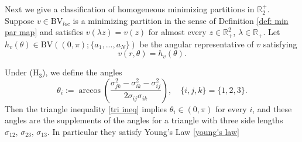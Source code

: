 \documentclass[leqno,11pt]{amsart}
\let\s=\sigma
\let\f=\frac
\theoremstyle{remark}
\newcommand{\BR}{\mathbb{R}}
\begin{document}
Next we give a classification of homogeneous minimizing partitions in $\BR_2^+$. Suppose $v\in \mathrm{BV}_{loc}$ is a minimizing partition in the sense of Definition \ref{def: min par map} and satisfies $v(\lambda z)=v(z)$ for almost every $z\in\BR_+^2$, $\lambda\in\BR_+$. Let $h_v(\theta)\in \mathrm{BV}((0,\pi);\{a_1,...,a_N\})$ be the angular representative of $v$ satisfying
\begin{equation*}
    v(r,\theta)=h_v(\theta). 
\end{equation*}

Under ($\mathrm{H}_3$), we define the angles 
\begin{equation*}
    \theta_i:= \arccos{(\f{\sigma_{jk}^2-\s_{ik}^2-\s_{ij}^2}{2\sigma_{ij}\s_{ik}})},\quad \{i,j,k\}=\{1,2,3\}.
\end{equation*}
Then the triangle inequality \eqref{tri ineq} implies $\theta_i\in (0,\pi)$ for every $i$, and these angles are the supplements of the angles for a triangle with three side lengths $\s_{12},\,\s_{23},\,\s_{13}$. In particular they satisfy Young's Law \eqref{young's law}
\end{document}
